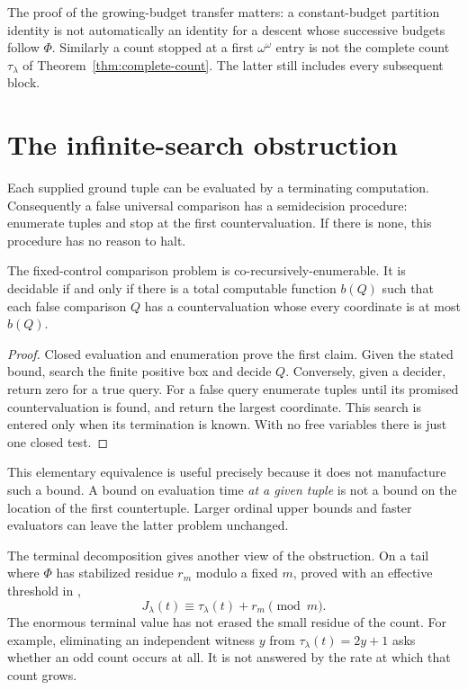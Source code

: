 \documentclass[11pt,a4paper]{article}
\begin{document}
The proof of the growing-budget transfer matters: a constant-budget partition
identity is not automatically an identity for a descent whose successive
budgets follow $\Phi$.  Similarly a count stopped at a first $\omega^\omega$
entry is not the complete count $\tau_\lambda$ of
Theorem~\ref{thm:complete-count}.  The latter still includes every subsequent block.

\section{The infinite-search obstruction}\label{sec:search}

Each supplied ground tuple can be evaluated by a terminating computation.
Consequently a false universal comparison has a semidecision procedure:
enumerate tuples and stop at the first countervaluation.  If there is none,
this procedure has no reason to halt.

\begin{proposition}\label{prop:counter-bound}
The fixed-control comparison problem is co-recursively-enumerable.  It is
decidable if and only if there is a total computable function $b(Q)$ such
that each false comparison $Q$ has a countervaluation whose every coordinate
is at most $b(Q)$.
\end{proposition}
\begin{proof}
Closed evaluation and enumeration prove the first claim.  Given the stated
bound, search the finite positive box and decide $Q$.  Conversely, given a
decider, return zero for a true query.  For a false query enumerate tuples
until its promised countervaluation is found, and return the largest
coordinate.  This search is entered only when its termination is known.
With no free variables there is just one closed test.
\end{proof}

This elementary equivalence is useful precisely because it does not manufacture
such a bound.  A bound on evaluation time \emph{at a given tuple} is not a bound
on the location of the first countertuple.  Larger ordinal upper bounds and
faster evaluators can leave the latter problem unchanged.

The terminal decomposition gives another view of the obstruction.  On a tail
where $\Phi$ has stabilized residue $r_m$ modulo a fixed $m$, proved with an
effective threshold in \cite{wwmultivariate},
\[
 J_\lambda(t)\equiv \tau_\lambda(t)+r_m\pmod m.
\]
The enormous terminal value has not erased the small residue of the count.
For example, eliminating an independent witness $y$ from
$\tau_\lambda(t)=2y+1$ asks whether an odd count occurs at all.
It is not answered by the rate at which that count grows.
\end{document}
